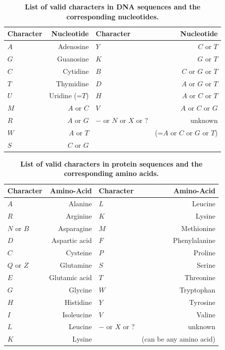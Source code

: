 \documentclass[a4paper,12pt]{article}
\begin{document}
\begin{table}
\begin{center}
\begin{tabular}{lr|lr}
\hline
Character & Nucleotide &   Character & Nucleotide \\
\hline
$A$       & Adenosine &     $Y$       & $C$ or $T$ \\
$G$       & Guanosine &       $K$       & $G$ or $T$ \\
$C$       & Cytidine &      $B$       & $C$ or $G$ or $T$\\
$T$       & Thymidine &       $D$       & $A$ or $G$ or $T$ \\
$U$       & Uridine (=$T$) & $H$       & $A$ or $C$ or $T$ \\
$M$       & $A$ or $C$ &    $V$       & $A$ or $C$ or $G$ \\
$R$       & $A$ or $G$ &    $-$ or $N$ or $X$ or $?$ & unknown  \\
$W$       & $A$ or $T$ &    & (=$A$ or $C$ or $G$ or $T$)\\
$S$       & $C$ or $G$ &   & \\
\hline
\end{tabular}
\end{center}
\caption{{\bf List of valid characters in DNA sequences and the corresponding nucleotides.}}\label{tab:ambigu_nt}
\end{table}
\begin{table}
\begin{center}
\begin{tabular}{lr|lr}
\hline
Character & Amino-Acid & Character & Amino-Acid \\
\hline
$A$       & Alanine &         $L$       & Leucine \\
$R$       & Arginine &        $K$       & Lysine \\
$N$ or $B$& Asparagine &      $M$       & Methionine \\
$D$       & Aspartic acid &   $F$       & Phenylalanine \\
$C$       & Cysteine &        $P$       & Proline \\
$Q$ or $Z$& Glutamine &       $S$       & Serine \\
$E$       & Glutamic acid &   $T$       & Threonine \\
$G$       & Glycine &         $W$       & Tryptophan \\
$H$       & Histidine &       $Y$       & Tyrosine \\
$I$       & Isoleucine &      $V$       & Valine \\
$L$       & Leucine &         $-$ or $X$ or $?$ & unknown \\
$K$       & Lysine &          & (can be any amino acid) \\
\hline
\end{tabular}
\end{center}
\caption{{\bf List of valid characters in protein sequences and the corresponding amino acids.}}\label{tab:ambigu_aa}
\end{table}
\end{document}
